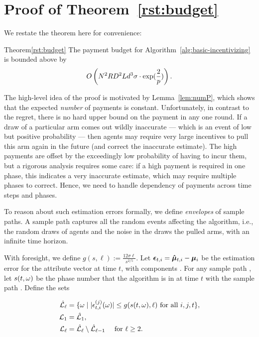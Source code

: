 \section{Proof of Theorem~\ref{rst:budget}}
\label{sec:payment-proof}

We restate the theorem here for convenience:

\begin{rtheorem}{Theorem}{\ref{rst:budget}}
The payment budget for Algorithm~\ref{alg:basic-incentivizing} is bounded above by 
\begin{align}
O \left(N^2 R D^2 L d^3 \sigma\cdot \exp(\frac{2}{p}) \right).  \nonumber 
\end{align}
\end{rtheorem}

The high-level idea of the proof is motivated by Lemma~\ref{lem:numP},
which shows that the expected \emph{number} of payments is constant.
Unfortunately, in contrast to the regret, there is no hard upper bound
on the payment in any one round.
If a draw of a particular arm comes out wildly inaccurate --- which is
an event of low but positive probability ---
then agents may require very large incentives to pull this arm again
in the future (and correct the inaccurate estimate).
The high payments are offset by the exceedingly low probability of
having to incur them, but a rigorous analysis requires some care:
if a high payment is required in one phase, this indicates a very
inaccurate estimate, which may require multiple phases to correct.
Hence, we need to handle dependency of payments across time steps and
phases.

To reason about such estimation errors formally, we define
\emph{envelopes} of sample paths.
A sample path \SP captures all the random events affecting the
algorithm, i.e., the random draws  of agents and the
noise \NoiseV[t] in the draws the pulled arms,
with an infinite time horizon.

With foresight, we define $g(s, \ell) := \frac{12 \sigma \ell}{s^{2/5}}$.
Let $\bm{\epsilon}_{t,i} = \bm{\hat{\mu}}_{t,i} - \bm{\mu}_{i}$ be the estimation
error for the attribute vector  at time $t$,
with components .
For any sample path \SP, let $s (t,\omega)$ be the phase number that the
algorithm is in at time $t$ with the sample path \SP.
Define the sets

\begin{align*}
\hat{\mathcal{L}}_\ell
  & = \{ \omega \mid |\epsilon_{t,i}^{(j)}(\omega)| \leq g(s(t,\omega),\ell)
    \mbox{ for all } i,j,t \},\\
{\mathcal L}_{1} & = \hat{\mathcal{L}}_1,\\ 
{\mathcal L}_{\ell} & = \hat{\mathcal{L}}_{\ell} \setminus \hat{\mathcal{L}}_{\ell-1}
  \quad \mbox{ for } \ell \geq 2.
\end{align*}

